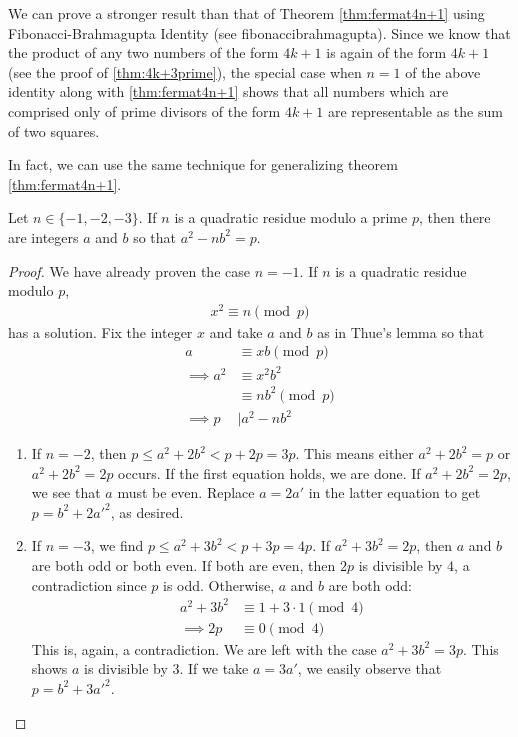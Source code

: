 \begin{remark}
	We can prove a stronger result than that of Theorem \autoref{thm:fermat4n+1} using Fibonacci-Brahmagupta Identity (see \gls{fibonaccibrahmagupta}). Since we know that the product of any two numbers of the form $4k+1$ is again of the form $4k+1$ (see the proof of \autoref{thm:4k+3prime}), the special case when $n=1$ of the above identity along with \autoref{thm:fermat4n+1} shows that all numbers which are comprised only of prime divisors of the form $4k+1$ are representable as the sum of two squares.
\end{remark}
In fact, we can use the same technique for generalizing theorem \autoref{thm:fermat4n+1}.
\begin{theorem}\label{thm:gen4n+1}
	Let $n\in\{-1,-2,-3\}$. If $n$ is a quadratic residue modulo a prime $p$, then there are integers $a$ and $b$ so that $a^2-nb^2=p$.
\end{theorem}

\begin{proof}
	We have already proven the case $n=-1$. If $n$ is a quadratic residue modulo $p$,
	\begin{align*}
		x^2\equiv n\pmod p
	\end{align*}
	has a solution. Fix the integer $x$ and take $a$ and $b$ as in Thue's lemma so that
	\begin{align*}
		a
			& \equiv xb\pmod p\\
		\implies a^2
			& \equiv x^2b^2\\
			& \equiv nb^2\pmod p\\
		\implies p
			& \mid a^2-nb^2
	\end{align*}

	\begin{enumerate}
		\item If $n=-2$, then $p\leq a^2+2b^2<p+2p=3p$. This means either $a^2+2b^2=p$ or $a^2+2b^2=2p$ occurs. If the first equation holds, we are done. If $a^2+2b^2=2p$, we see that $a$ must be even. Replace $a=2a'$ in the latter equation to get $p=b^2+2a'^2$, as desired.
		\item If $n=-3$, we find $p\leq a^2+3b^2<p+3p=4p$. If $a^2+3b^2=2p$, then $a$ and $b$ are both odd or both even. If both are even, then $2p$ is divisible by $4$, a contradiction since $p$ is odd. Otherwise, $a$ and $b$ are both odd:
		\begin{align*}
			a^2+3b^2 & \equiv1+3\cdot 1\pmod 4\\
			\implies 2p	 & \equiv 0 \pmod 4
		\end{align*}
		This is, again, a contradiction. We are left with the case $a^2+3b^2=3p$. This shows $a$ is divisible by $3$. If we take $a=3a'$, we easily observe that $p=b^2+3a'^2$.
	\end{enumerate}
\end{proof}

